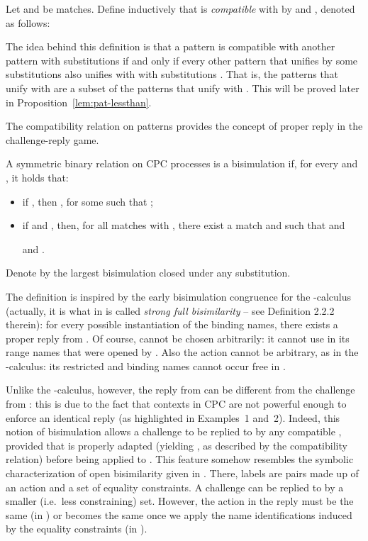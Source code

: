 \documentclass{LMCS}
\begin{document}
\begin{defi}
\label{def:compat}
Let  and  be matches.
Define inductively that  is {\em compatible} with  by  and , 
denoted  as follows:

\end{defi}

The idea behind this definition is that a pattern  is compatible
with another pattern  with substitutions  if and only if every other pattern  that
unifies  by some substitutions  also unifies with
 with substitutions .
That is, the patterns that unify with  are a subset of
the patterns that unify with .  This will be proved later in
Proposition~\ref{lem:pat-lessthan}.

The compatibility relation on patterns provides the concept of proper reply in the challenge-reply game.

\begin{defi}[Bisimulation]
\label{def:bisim}
A symmetric binary relation on CPC processes  is a bisimulation if,
for every  and , it holds that:
\begin{itemize}
  \item if , then , for some  such that ;
  \item if  and ,
		then, for all matches  with 
        ,
        there exist a match  and  
		such that
         and
         
        and .
\end{itemize}
Denote by  the largest bisimulation closed under any substitution.
\end{defi}

The definition is inspired by the early bisimulation congruence for the
-calculus \cite{milner.parrow.ea:calculus-mobile} (actually, it is what
in \cite{sangiorgi.walker:theory-mobile} is called {\em strong full bisimilarity} -- see Definition 2.2.2 therein):
	for every possible instantiation  of the binding names,
	there exists a proper reply from .
Of course,  cannot be chosen arbitrarily:
	it cannot use in its range names that were opened by .
Also the action  cannot be arbitrary, as in the -calculus:
	its restricted and binding names cannot occur free in .

Unlike the -calculus, however, the reply from  can be
different from the challenge from :
	this is due to the fact that contexts in CPC are not powerful enough to
	enforce an identical reply (as highlighted in Examples~1 and~2).
Indeed, this notion of bisimulation allows a challenge  to be replied to by
any compatible , provided that  is properly adapted (yielding , as
described by the compatibility relation) before being applied to .
This feature somehow resembles the symbolic characterization of 
open bisimilarity given in \cite{San96,BM08}. There, labels are pairs made up
of an action and a set of equality constraints. A challenge can be replied to by a 
smaller (i.e.~less constraining) set. However, the action in the reply must be 
the same (in \cite{San96}) or becomes the same once we apply the name identifications
induced by the equality constraints (in \cite{BM08}).
\end{document}
